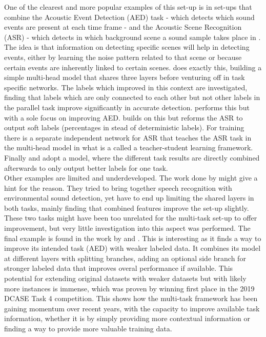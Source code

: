 One of the clearest and more popular examples of this set-up is in set-ups that combine the Acoustic Event Detection (AED) task - which detects which sound events are present at each time frame - and the Acoustic Scene Recognition (ASR) - which detects in which background scene a sound sample takes place in \citep{tonami2019joint} \citep{xu2019multi} \citep{imoto2020sound} \citep{jung2020acoustic} \citep{komatsu2020scene}. The idea is that information on detecting specific scenes will help in detecting events, either by learning the noise pattern related to that scene or because certain events are inherently linked to certain scenes. \cite{tonami2019joint} does exactly this, building a simple multi-head model that shares three layers before venturing off in task specific networks. The labels which improved in this context are investigated, finding that labels which are only connected to each other but not other labels in the parallel task improve significantly in accurate detection. \cite{xu2019multi} performs this but with a sole focus on improving AED. \cite{imoto2020sound} builds on this but reforms the ASR to output soft labels (percentages in stead of deterministic labels). For training there is a separate independent network for ASR that teaches the ASR task in the multi-head model in what is a called a teacher-student learning framework. Finally \citep{jung2020acoustic} and \citep{komatsu2020scene} adopt a model, where the different task results are directly combined afterwards to only output better labels for one task.\\

Other examples are limited and underdeveloped.  The work done by \cite{sakti2016deep} might give a hint for the reason. They tried to bring together speech recognition with environmental sound detection, yet have to end up limiting the shared layers in both tasks, mainly finding that combined features improve the set-up slightly. These two tasks might have been too unrelated for the multi-task set-up to offer improvement, but very little investigation into this aspect was performed. The final example is found in the work by \cite{huang2020guided} and \cite{huang2020multi}. This is interesting as it finds a way to improve its intended task (AED) with weaker labeled data. It combines its model at different layers with splitting branches, adding an optional side branch for stronger labeled data that improves overal performance if available. This potential for extending original datasets with weaker datasets but with likely more instances is immense, which was proven by winning first place in the 2019 DCASE Task 4 competition. This shows how the multi-task framework has been gaining momentum over recent years, with the capacity to improve available task information, whether it is by simply providing more contextual information or finding a way to provide more valuable training data.\\


